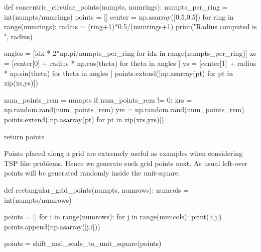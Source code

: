 \nwenddocs{}\plusendmoddef\nwstartdeflinemarkup{}\nwenddeflinemarkup
def concentric_circular_points(numpts, numrings):
     numpts_per_ring = int(numpts/numrings)
     points          = []
     center          = np.asarray([0.5,0.5])
     for ring in range(numrings):
          radius = (ring+1)*0.5/(numrings+1)
          print("Radius computed is ", radius)
         
          angles = [idx * 2*np.pi/numpts_per_ring for idx in range(numpts_per_ring)]
          xs     = [center[0] + radius * np.cos(theta) for theta in angles ]
          ys     = [center[1] + radius * np.sin(theta) for theta in angles ]
          points.extend([np.asarray(pt) for pt in zip(xs,ys)])
     
     num_points_rem = numpts%
     if num_points_rem != 0:
          xrs = np.random.rand(num_points_rem)
          yrs = np.random.rand(num_points_rem)
          points.extend([np.asarray(pt) for pt in zip(xrs,yrs)])

     return points
\nwendcode{}\nwdocspar

Points placed along a grid are extremely useful as examples when considering TSP like 
problems. Hence we generate such grid points next. As usual left-over points will 
be generated randomly inside the unit-square. 



\nwenddocs{}\plusendmoddef\nwstartdeflinemarkup{}\nwenddeflinemarkup
def rectangular_grid_points(numpts, numrows):
     numcols = int(numpts/numrows)
     
     points = []
     for i in range(numrows):
         for j in range(numcols):
              print([i,j])
              points.append(np.asarray([j,i]))

     points = shift_and_scale_to_unit_square(points)

